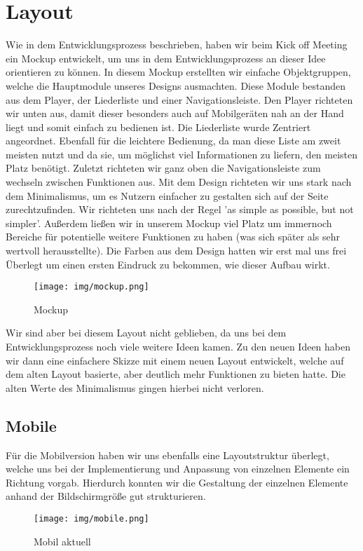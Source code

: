 \documentclass{article}
\begin{document}
\section{Layout}
Wie in dem Entwicklungsprozess beschrieben, haben wir beim Kick off Meeting ein Mockup entwickelt, um uns in dem Entwicklungsprozess an dieser Idee orientieren zu können. In diesem Mockup erstellten wir einfache Objektgruppen, welche die Hauptmodule unseres Designs ausmachten. Diese Module bestanden aus dem Player, der Liederliste und einer Navigationsleiste. Den Player richteten wir unten aus, damit dieser besonders auch auf Mobilgeräten nah an der Hand liegt und somit einfach zu bedienen ist. Die Liederliste wurde Zentriert angeordnet. Ebenfall für die leichtere Bedienung, da man diese Liste am zweit meisten nutzt und da sie, um möglichst viel Informationen zu liefern, den meisten Platz benötigt. Zuletzt richteten wir ganz oben die Navigationsleiste zum wechseln zwischen Funktionen aus. Mit dem Design richteten wir uns stark nach dem Minimalismus, um es Nutzern einfacher zu gestalten sich auf der Seite zurechtzufinden. Wir richteten uns nach der Regel 'as simple as possible, but not simpler'. Außerdem ließen wir in unserem Mockup viel Platz um immernoch Bereiche für potentielle weitere Funktionen zu haben (was sich später als sehr wertvoll herausstellte). Die Farben aus dem Design hatten wir erst mal uns frei Überlegt um einen ersten Eindruck zu bekommen, wie dieser Aufbau wirkt.\\

\begin{figure}[H]
 \centering
 \texttt{[image: img/mockup.png]}
 \caption{Mockup}
 \label{fig:mockup}
\end{figure}

\noindent Wir sind aber bei diesem Layout nicht geblieben, da uns bei dem Entwicklungsprozess noch viele weitere Ideen kamen. Zu den neuen Ideen haben wir dann eine einfachere Skizze mit einem neuen Layout entwickelt, welche auf dem alten Layout basierte, aber deutlich mehr Funktionen zu bieten hatte. Die alten Werte des Minimalismus gingen hierbei nicht verloren.\\



\subsection{Mobile}
Für die Mobilversion haben wir uns ebenfalls eine Layoutstruktur überlegt, welche uns bei der Implementierung und Anpassung von einzelnen Elemente ein Richtung vorgab. Hierdurch konnten wir die Gestaltung der einzelnen Elemente anhand der Bildschirmgröße gut strukturieren. 
\begin{figure}[H]
 \centering
 \texttt{[image: img/mobile.png]}
 \caption{Mobil aktuell}
 \label{fig:Mobil}
\end{figure}
\end{document}

